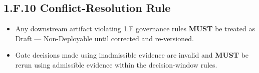 \documentclass[10pt]{article}
\begin{document}
\subsection*{1.F.10 Conflict-Resolution Rule}
{}

\begin{itemize}
\item Any downstream artifact violating 1.F governance rules \textbf{MUST} be treated as Draft — Non-Deployable until corrected and re-versioned.
\item Gate decisions made using inadmissible evidence are invalid and \textbf{MUST} be rerun using admissible evidence within the decision-window rules.
\end{itemize}
\end{document}
